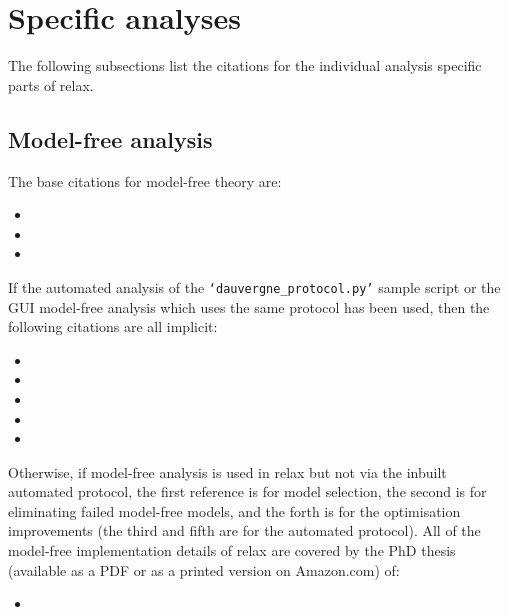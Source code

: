 
\section{Specific analyses}

The following subsections list the citations for the individual analysis specific parts of relax.



\subsection{Model-free analysis}

The base citations for model-free theory are:

\begin{itemize}
\item {}
\item {}
\item {}
\end{itemize}

If the automated analysis of the \texttt{`dauvergne\_protocol.py'} sample script or the GUI model-free analysis which uses the same protocol has been used, then the following citations are all implicit:

\begin{itemize}
\item {}
\item {}
\item {}
\item {}
\item {}
\end{itemize}

Otherwise, if model-free analysis is used in relax but not via the inbuilt automated protocol, the first reference is for model selection, the second is for eliminating failed model-free models, and the forth is for the optimisation improvements (the third and fifth are for the automated protocol).  All of the model-free implementation details of relax are covered by the PhD thesis (available as a PDF or as a printed version on Amazon.com) of:

\begin{itemize}
\item {}
\end{itemize}

